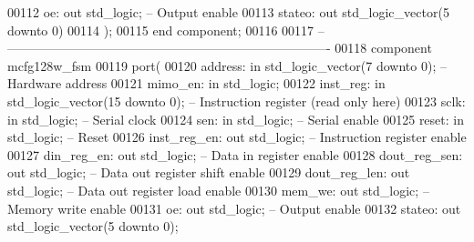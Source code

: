 \begin{DoxyCode}
00112         oe: \textcolor{keywordflow}{out} \textcolor{comment}{std\_logic};              \textcolor{keyword}{-- Output enable}
00113         stateo: \textcolor{keywordflow}{out} \textcolor{comment}{std\_logic\_vector}(\textcolor{vhdllogic}{}\textcolor{vhdllogic}{5} \textcolor{keywordflow}{downto} \textcolor{vhdllogic}{}\textcolor{vhdllogic}{0})
00114     );
00115 \textcolor{keywordflow}{end} \textcolor{keywordflow}{component};
00116 
00117 \textcolor{keyword}{-- ----------------------------------------------------------------------------}
00118 \textcolor{keywordflow}{component} mcfg128w\_fsm
00119     \textcolor{keywordflow}{port}(
00120         address: \textcolor{keywordflow}{in} \textcolor{comment}{std\_logic\_vector}(\textcolor{vhdllogic}{}\textcolor{vhdllogic}{7} \textcolor{keywordflow}{downto} \textcolor{vhdllogic}{}\textcolor{vhdllogic}{0});   \textcolor{keyword}{-- Hardware address}
00121         mimo\_en: \textcolor{keywordflow}{in} \textcolor{comment}{std\_logic};
00122         inst\_reg: \textcolor{keywordflow}{in} \textcolor{comment}{std\_logic\_vector}(\textcolor{vhdllogic}{}\textcolor{vhdllogic}{15} \textcolor{keywordflow}{downto} \textcolor{vhdllogic}{}\textcolor{vhdllogic}{0}); \textcolor{keyword}{-- Instruction register (read only here)}
00123         sclk: \textcolor{keywordflow}{in} \textcolor{comment}{std\_logic};             \textcolor{keyword}{-- Serial clock}
00124         sen: \textcolor{keywordflow}{in} \textcolor{comment}{std\_logic};              \textcolor{keyword}{-- Serial enable}
00125         reset: \textcolor{keywordflow}{in} \textcolor{comment}{std\_logic};                \textcolor{keyword}{-- Reset}
00126         inst\_reg\_en: \textcolor{keywordflow}{out} \textcolor{comment}{std\_logic};         \textcolor{keyword}{-- Instruction register enable}
00127         din\_reg\_en: \textcolor{keywordflow}{out} \textcolor{comment}{std\_logic};          \textcolor{keyword}{-- Data in register enable}
00128         dout\_reg\_sen: \textcolor{keywordflow}{out} \textcolor{comment}{std\_logic};            \textcolor{keyword}{-- Data out register shift enable}
00129         dout\_reg\_len: \textcolor{keywordflow}{out} \textcolor{comment}{std\_logic};            \textcolor{keyword}{-- Data out register load enable}
00130         mem\_we: \textcolor{keywordflow}{out} \textcolor{comment}{std\_logic};              \textcolor{keyword}{-- Memory write enable}
00131         oe: \textcolor{keywordflow}{out} \textcolor{comment}{std\_logic};              \textcolor{keyword}{-- Output enable}
00132         stateo: \textcolor{keywordflow}{out} \textcolor{comment}{std\_logic\_vector}(\textcolor{vhdllogic}{}\textcolor{vhdllogic}{5} \textcolor{keywordflow}{downto} \textcolor{vhdllogic}{}\textcolor{vhdllogic}{0});

\end{DoxyCode}
